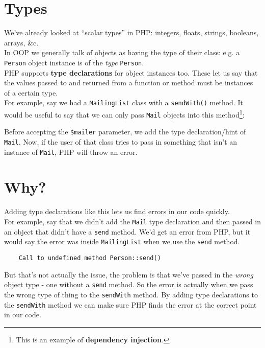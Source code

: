 \section{Types}

We've already looked at ``scalar types'' in PHP: integers, floats, strings, booleans, arrays, \&c.
\\

In OOP we generally talk of objects as having the type of their class: e.g. a \texttt{Person} object instance is of the \textit{type} \texttt{Person}.
\\

PHP supports \textbf{type declarations} for object instances too. These let us say that the values passed to and returned from a function or method must be instances of a certain type.
\\

For example, say we had a \texttt{MailingList} class with a \texttt{sendWith()} method. It would be useful to say that we can only pass \texttt{Mail} objects into this method\footnote{This is an example of \textbf{dependency injection}.}:


Before accepting the \texttt{\$mailer} parameter, we add the type declaration/hint of \texttt{Mail}. Now, if the user of that class tries to pass in something that isn't an instance of \texttt{Mail}, PHP will throw an error.



\section{Why?}

Adding type declarations like this lets us find errors in our code quickly.
\\

For example, say that we didn't add the \texttt{Mail} type declaration and then passed in an object that didn't have a \texttt{send} method. We'd get an error from PHP, but it would say the error was inside \texttt{MailingList} when we use the \texttt{send} method.

\begin{verbatim}
    Call to undefined method Person::send()
\end{verbatim}

But that's not actually the issue, the problem is that we've passed in the \textit{wrong} object type - one without a \texttt{send} method. So the error is actually when we pass the wrong type of thing to the \texttt{sendWith} method. By adding type declarations to the \texttt{sendWith} method we can make sure PHP finds the error at the correct point in our code.

